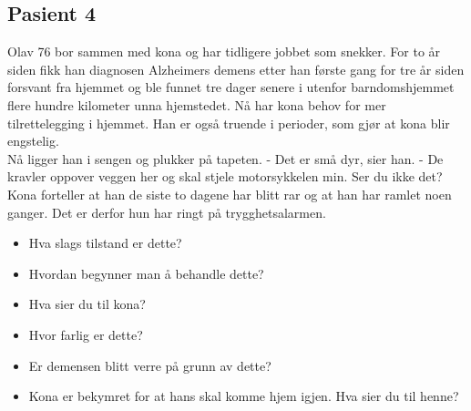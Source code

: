 			\subsection{Pasient 4}
				Olav 76 bor sammen med kona og har tidligere jobbet som snekker. For to år siden fikk han diagnosen Alzheimers demens etter han første gang for tre år siden forsvant fra hjemmet og ble funnet tre dager senere i utenfor barndomshjemmet flere hundre kilometer unna hjemstedet. Nå har kona behov for mer tilrettelegging i hjemmet. Han er også truende i perioder, som gjør at kona blir engstelig. \\
				Nå ligger han i sengen og plukker på tapeten. - Det er små dyr, sier han. - De kravler oppover veggen her og skal stjele motorsykkelen min. Ser du ikke det?\\
				Kona forteller at han de siste to dagene har blitt rar og at han har ramlet noen ganger. Det er derfor hun har ringt på trygghetsalarmen.\\

					\begin{itemize}
						\item Hva slags tilstand er dette?\\
						\item Hvordan begynner man å behandle dette?\\
						\item Hva sier du til kona?\\
						\item Hvor farlig er dette?\\
						\item Er demensen blitt verre på grunn av dette?\\
						\item Kona er bekymret for at hans skal komme hjem igjen. Hva sier du til henne?\\
					\end{itemize}	


\newpage